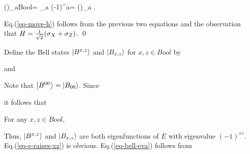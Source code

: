 \beq
\sigz(\bitb)\sum_{a\in Bool}=
\sum_a (-1)^a=
\sigz(\bita)\sum_a
\;.
\eeq

Eq.(\ref{eq-move-h}) follows from
the previous two equations and
the observation that $H = \frac{1}{\sqrt{2}}
({\sigma_X} + {\sigma_Z})$.
\qed

Define the Bell states $\left\vert{B^{x,z}}\right\rangle$
and $\left\vert{B_{x,z}}\right\rangle$ for $x,z\in Bool$ by

and

Note that $\left\vert{B^{00}}\right\rangle=\left\vert{B_{00}}\right\rangle$. Since

it follows that


\claim

For any $x,z\in Bool$,

Thus,
$\left\vert{B^{x,z}}\right\rangle$ and $\left\vert{B_{x,z}}\right\rangle$
are both eigenfunctions of $E$ with
eigenvalue $(-1)^{xz}$.
\proof
Eq.(\ref{eq-e-raises-xz}) is
obvious. Eq.(\ref{eq-bell-eva})
follows from

